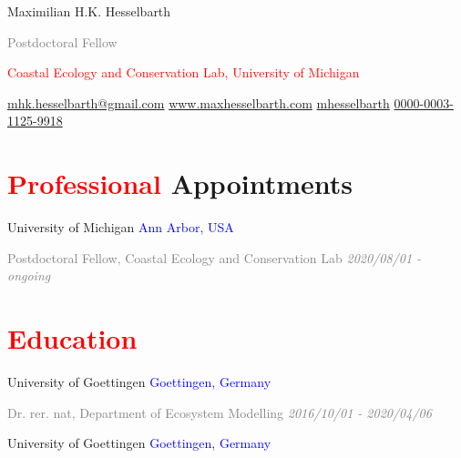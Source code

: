 \documentclass[hidelinks]{report}
\begin{document}

\begin{center}

{\huge Maximilian H.K. Hesselbarth}

\textcolor{grey}{\small{Postdoctoral Fellow}}

\textcolor{red}{Coastal Ecology and Conservation Lab, University of Michigan}

\small{
	\href{mailto:mhk.hesselbarth@gmail.com}{\faEnvelope \hspace{0.1em} mhk.hesselbarth@gmail.com} \hspace{1em}
	\href{https://www.maxhesselbarth.com}{\faHome \hspace{0.1em} www.maxhesselbarth.com} \hspace{1em}
	\href{https://github.com/mhesselbarth}{\faGithub \hspace{0.1em} mhesselbarth} \hspace{1em}
	\href{https://orcid.org/0000-0003-1125-9918}{\orcidlink{} 0000-0003-1125-9918}
}

\end{center}

 \vspace{1em}
 

\section*{\textcolor{red}{Professional} Appointments \sout{\hfill}}

University of Michigan
\hfill
\textcolor{blue}{Ann Arbor, USA}

\textcolor{grey}{\footnotesize{Postdoctoral Fellow, Coastal Ecology and Conservation Lab}}
\hfill
\textcolor{grey}{\textit{2020/08/01 - ongoing}}


\section*{\textcolor{red}{Education} \sout{\hfill}}

University of Goettingen
\hfill
\textcolor{blue}{Goettingen, Germany}

\textcolor{grey}{\footnotesize{Dr. rer. nat, Department of Ecosystem Modelling}}
\hfill
\textcolor{grey}{\textit{2016/10/01 - 2020/04/06}}

University of Goettingen
\hfill
\textcolor{blue}{Goettingen, Germany}
\end{document}
